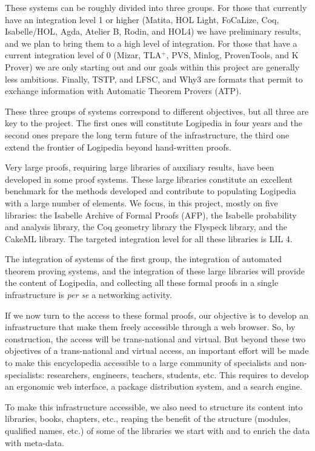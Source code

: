 These systems can be roughly divided into three groups.  For those
that currently have an integration level 1 or higher (Matita, HOL
Light, FoCaLize, Coq, Isabelle/HOL, Agda, Atelier B, Rodin, and HOL4)
we have preliminary results, and we plan to bring them to a high level
of integration.  For those that have a current integration level of 0
(Mizar, TLA$^+$, PVS, Minlog, ProvenTools, and K Prover) we are only
starting out and our goals within this project are generally less
ambitious. Finally, TSTP, and LFSC, and Why3 are formats that permit
to exchange information with Automatic Theorem Provers (ATP).

These three groups of systems correspond to different
objectives, but all three are key to the project. The first ones will
constitute Logipedia in four years and the second ones prepare the
long term future of the infrastructure, the third one extend the
frontier of Logipedia beyond hand-written proofs.

Very large proofs, requiring large libraries of auxiliary results,
have been developed in some proof systems. These large libraries
constitute an excellent benchmark for the methods developed and
contribute to populating Logipedia with a large number of elements.
We focus, in this project, mostly on five libraries: the Isabelle
Archive of Formal Proofs (AFP), the Isabelle probability and analysis
library, the Coq geometry library the Flyspeck library, and the CakeML
library. The targeted integration level for all these libraries is
LIL 4.

The integration of systems of the first group, the integration of
automated theorem proving systems, and the integration of these large
libraries will provide the content of Logipedia, and collecting all
these formal proofs in a single infrastructure is {\em per se} a
networking activity.

If we now turn to the access to these formal proofs, our objective is
to develop an infrastructure that make them freely accessible through
a web browser. So, by construction, the access will be trans-national
and virtual. But beyond these two objectives of a trans-national and
virtual access, an important effort will be made to make this
encyclopedia accessible to a large community of specialists and
non-specialists: researchers, engineers, teachers, students, etc.
This requires to develop an ergonomic web interface,
a package distribution system, and a search engine.

To make this infrastructure accessible, we also need to structure its
content into libraries, books, chapters, etc., reaping the benefit of
the structure (modules, qualified names, etc.) of some of the
libraries we start with and to enrich the data with meta-data.


